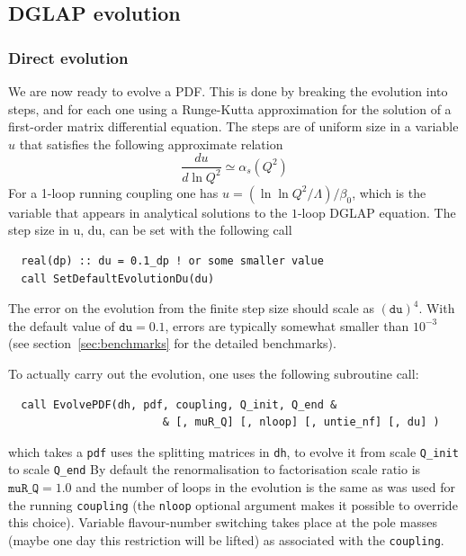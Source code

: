 \documentclass[12pt]{article}
\newcommand{\as}{\alpha_s}
\newcommand{\ttt}[1]{\texttt{#1}}
\begin{document}
\subsection{DGLAP evolution}
\label{sec:dglap-ev}


\subsubsection{Direct evolution}
\label{sec:direct-evolution}

We are now ready to evolve a PDF. This is done by breaking the
evolution into steps, and for each one using a Runge-Kutta
approximation for the solution of a first-order matrix differential
equation. The steps are of uniform size in a variable $u$ that
satisfies the following approximate relation
\begin{equation}
  \label{eq:du}
  \frac{du}{d\ln Q^2} \simeq \as(Q^2)
\end{equation}
For a 1-loop running coupling one has $u = (\ln \ln
Q^2/\Lambda)/\beta_0$, which is the variable that appears in
analytical solutions to the $1$-loop DGLAP equation.
%
The step size in u, du, can be set with the following call
\begin{verbatim}
  real(dp) :: du = 0.1_dp ! or some smaller value
  call SetDefaultEvolutionDu(du)
\end{verbatim}
The error on the evolution from the finite step size should scale as
$(\ttt{du})^4$. With the default value of $\ttt{du}=0.1$, errors are
typically somewhat smaller than $10^{-3}$ (see
section~\ref{sec:benchmarks} for the detailed benchmarks).

To actually carry out the evolution, one uses the following subroutine
call:
\begin{verbatim}
  call EvolvePDF(dh, pdf, coupling, Q_init, Q_end &
                        & [, muR_Q] [, nloop] [, untie_nf] [, du] )
\end{verbatim}
which takes a \ttt{pdf} uses the splitting matrices in \ttt{dh}, to
evolve it from scale \ttt{Q\_init} to scale \ttt{Q\_end}
%
By default the renormalisation to factorisation scale ratio is
$\ttt{muR\_Q} = 1.0$ and the number of loops in the evolution is the
same as was used for the running \ttt{coupling} (the \ttt{nloop}
optional argument makes it possible to override this choice). Variable
flavour-number switching takes place at the pole masses (maybe one day
this restriction will be lifted) as associated with the
\ttt{coupling}. 
\end{document}
